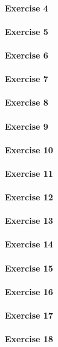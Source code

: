 \paragraph{Exercise 4}
\paragraph{Exercise 5}
\paragraph{Exercise 6}
\paragraph{Exercise 7}
\paragraph{Exercise 8}
\paragraph{Exercise 9}
\paragraph{Exercise 10}
\paragraph{Exercise 11}
\paragraph{Exercise 12}
\paragraph{Exercise 13}
\paragraph{Exercise 14}
\paragraph{Exercise 15}
\paragraph{Exercise 16}
\paragraph{Exercise 17}
\paragraph{Exercise 18}
